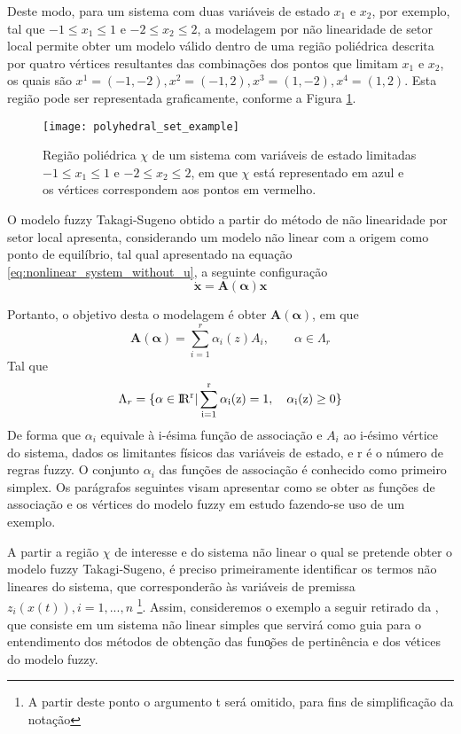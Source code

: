 Deste modo, para um sistema com duas variáveis de estado $x_1$ e $x_2$, por exemplo, tal que $-1 \leq x_1 \leq 1 $ e $-2 \leq x_2 \leq 2$, a modelagem por não linearidade de setor local permite obter um modelo válido dentro de uma região poliédrica descrita por quatro vértices resultantes das combinações dos pontos que limitam $x_1$ e $x_2$, os quais são $x^1 = (-1, -2), x^2 = (-1, 2), x^3 = (1, -2), x^4 = (1, 2)$. Esta região pode ser representada graficamente, conforme a Figura \ref{fig:poliedro_exemplo}.

\begin{figure}[htbp]
	\centering
	\texttt{[image: polyhedral\_set\_example]}
	\caption{Região poliédrica $\chi$ de um sistema com variáveis de estado limitadas $-1 \leq x_1 \leq 1 $ e $-2 \leq x_2 \leq 2$, em que $\chi$ está representado em azul e os vértices correspondem aos pontos em vermelho.}
	 \label{fig:poliedro_exemplo}
\end{figure}

O modelo fuzzy Takagi-Sugeno obtido a partir do método de não linearidade por setor local apresenta, considerando um modelo não linear com a origem como ponto de equilíbrio, tal qual apresentado na equação \ref{eq:nonlinear_system_without_u}, a seguinte configuração
\begin{equation}\label{eq:fuzzyTS_system}
\mathbf{\dot{x}} = \mathbf{A(\alpha) x}
\end{equation}

Portanto, o objetivo desta o modelagem é obter $\mathbf{A(\alpha)}$, em que
\begin{equation}\label{eq:A_alpha}
\mathbf{A(\alpha)} = \sum_{i=1}^{r} \alpha_i(z) A_i,\qquad\alpha\in\Lambda_r
\end{equation}
Tal que
\begin{equation}\label{lambda_r}
\Lambda_r = \{\alpha \in \rm I\!R^r | \sum_{i = 1}^{r} \alpha_i(z) = 1,\quad \alpha_i(z) \geq 0\}
\end{equation}
De forma que $\alpha_i$ equivale à i-ésima função de associação e $A_i$ ao i-ésimo vértice do sistema, dados os limitantes físicos das variáveis de estado, e r é o número de regras fuzzy. O conjunto $\alpha_i$ das funções de associação é conhecido como primeiro simplex. Os parágrafos seguintes visam apresentar como se obter as funções de associação e os vértices do modelo fuzzy em estudo fazendo-se uso de um exemplo.

A partir a região $\chi$ de interesse e do sistema não linear o qual se pretende obter o modelo fuzzy Takagi-Sugeno, é preciso primeiramente identificar os termos não lineares do sistema, que corresponderão às variáveis de premissa $z_i(x(t)), i = 1, ..., n$ \footnote{A partir deste ponto o argumento t será omitido, para fins de simplificação da notação}. Assim, consideremos o exemplo a seguir retirado da \cite{articlets:2009}, que consiste em um sistema não linear simples que servirá como guia para o entendimento dos métodos de obtenção das fun\c{o}\~ {o}es de pertinência e dos vétices do modelo fuzzy.

